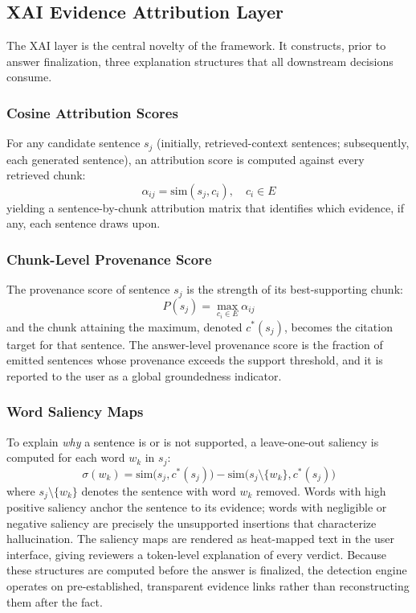 \documentclass[journal]{IEEEtran}
\begin{document}
\subsection{XAI Evidence Attribution Layer}
The XAI layer is the central novelty of the framework. It constructs, prior
to answer finalization, three explanation structures that all downstream
decisions consume.

\subsubsection{Cosine Attribution Scores}
For any candidate sentence $s_j$ (initially, retrieved-context sentences;
subsequently, each generated sentence), an attribution score is computed
against every retrieved chunk:
\begin{equation}
\alpha_{ij} = \mathrm{sim}(s_j, c_i), \quad c_i \in E
\label{eq:attribution}
\end{equation}
yielding a sentence-by-chunk attribution matrix that identifies which
evidence, if any, each sentence draws upon.

\subsubsection{Chunk-Level Provenance Score}
The provenance score of sentence $s_j$ is the strength of its
best-supporting chunk:
\begin{equation}
P(s_j) = \max_{c_i \in E} \alpha_{ij}
\label{eq:provenance}
\end{equation}
and the chunk attaining the maximum, denoted $c^{*}(s_j)$, becomes the
citation target for that sentence. The answer-level provenance score is the
fraction of emitted sentences whose provenance exceeds the support
threshold, and it is reported to the user as a global groundedness
indicator.

\subsubsection{Word Saliency Maps}
To explain \emph{why} a sentence is or is not supported, a leave-one-out
saliency is computed for each word $w_k$ in $s_j$:
\begin{equation}
\sigma(w_k) = \mathrm{sim}\big(s_j, c^{*}(s_j)\big) -
\mathrm{sim}\big(s_j \setminus \{w_k\}, c^{*}(s_j)\big)
\label{eq:saliency}
\end{equation}
where $s_j \setminus \{w_k\}$ denotes the sentence with word $w_k$ removed.
Words with high positive saliency anchor the sentence to its evidence; words
with negligible or negative saliency are precisely the unsupported
insertions that characterize hallucination. The saliency maps are rendered
as heat-mapped text in the user interface, giving reviewers a token-level
explanation of every verdict. Because these structures are computed before
the answer is finalized, the detection engine operates on pre-established,
transparent evidence links rather than reconstructing them after the fact.
\end{document}
